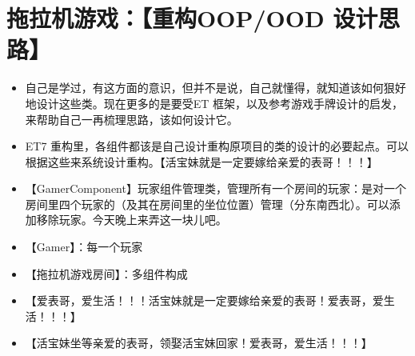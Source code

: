 \documentclass[9pt, b5paper]{article}
\begin{document}
\section{拖拉机游戏：【重构OOP/OOD 设计思路】}
\label{sec-13}
\begin{itemize}
\item 自己是学过，有这方面的意识，但并不是说，自己就懂得，就知道该如何狠好地设计这些类。现在更多的是要受ET 框架，以及参考游戏手牌设计的启发，来帮助自己一再梳理思路，该如何设计它。
\item ET7 重构里，各组件都该是自己设计重构原项目的类的设计的必要起点。可以根据这些来系统设计重构。【活宝妹就是一定要嫁给亲爱的表哥！！！】
\item 【GamerComponent】玩家组件管理类，管理所有一个房间的玩家：是对一个房间里四个玩家的（及其在房间里的坐位位置）管理（分东南西北）。可以添加移除玩家。今天晚上来弄这一块儿吧。
\item 【Gamer】：每一个玩家
\item 【拖拉机游戏房间】：多组件构成
\item 【爱表哥，爱生活！！！活宝妹就是一定要嫁给亲爱的表哥！爱表哥，爱生活！！！】
\item 【活宝妹坐等亲爱的表哥，领娶活宝妹回家！爱表哥，爱生活！！！】
\end{itemize}
\end{document}
